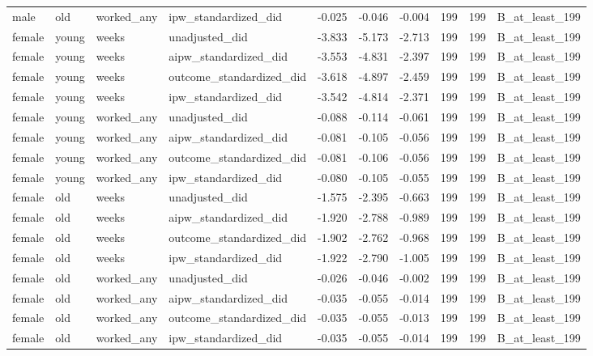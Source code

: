 \begin{table}
\begin{tabular}[t]{llllrrrrrl}
\addlinespace
male & old & worked\_any & ipw\_standardized\_did & -0.025 & -0.046 & -0.004 & 199 & 199 & B\_at\_least\_199\\
female & young & weeks & unadjusted\_did & -3.833 & -5.173 & -2.713 & 199 & 199 & B\_at\_least\_199\\
female & young & weeks & aipw\_standardized\_did & -3.553 & -4.831 & -2.397 & 199 & 199 & B\_at\_least\_199\\
female & young & weeks & outcome\_standardized\_did & -3.618 & -4.897 & -2.459 & 199 & 199 & B\_at\_least\_199\\
female & young & weeks & ipw\_standardized\_did & -3.542 & -4.814 & -2.371 & 199 & 199 & B\_at\_least\_199\\
\addlinespace
female & young & worked\_any & unadjusted\_did & -0.088 & -0.114 & -0.061 & 199 & 199 & B\_at\_least\_199\\
female & young & worked\_any & aipw\_standardized\_did & -0.081 & -0.105 & -0.056 & 199 & 199 & B\_at\_least\_199\\
female & young & worked\_any & outcome\_standardized\_did & -0.081 & -0.106 & -0.056 & 199 & 199 & B\_at\_least\_199\\
female & young & worked\_any & ipw\_standardized\_did & -0.080 & -0.105 & -0.055 & 199 & 199 & B\_at\_least\_199\\
female & old & weeks & unadjusted\_did & -1.575 & -2.395 & -0.663 & 199 & 199 & B\_at\_least\_199\\
\addlinespace
female & old & weeks & aipw\_standardized\_did & -1.920 & -2.788 & -0.989 & 199 & 199 & B\_at\_least\_199\\
female & old & weeks & outcome\_standardized\_did & -1.902 & -2.762 & -0.968 & 199 & 199 & B\_at\_least\_199\\
female & old & weeks & ipw\_standardized\_did & -1.922 & -2.790 & -1.005 & 199 & 199 & B\_at\_least\_199\\
female & old & worked\_any & unadjusted\_did & -0.026 & -0.046 & -0.002 & 199 & 199 & B\_at\_least\_199\\
female & old & worked\_any & aipw\_standardized\_did & -0.035 & -0.055 & -0.014 & 199 & 199 & B\_at\_least\_199\\
\addlinespace
female & old & worked\_any & outcome\_standardized\_did & -0.035 & -0.055 & -0.013 & 199 & 199 & B\_at\_least\_199\\
female & old & worked\_any & ipw\_standardized\_did & -0.035 & -0.055 & -0.014 & 199 & 199 & B\_at\_least\_199\\
\bottomrule
\end{tabular}
\end{table}
